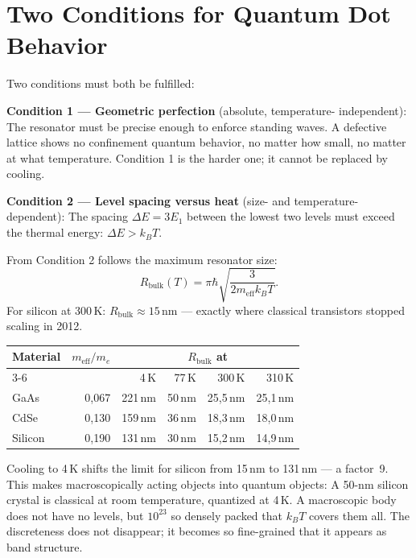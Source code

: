 \section{Two Conditions for Quantum Dot Behavior}

Two conditions must both be fulfilled:

\textbf{Condition 1 --- Geometric perfection} (absolute, temperature-
independent): The resonator must be precise enough to enforce standing waves. A defective lattice shows no confinement
quantum behavior, no matter how small, no matter at what temperature. Condition 1
is the harder one; it cannot be replaced by cooling.

\textbf{Condition 2 --- Level spacing versus heat} (size- and
temperature-dependent): The spacing $\Delta E = 3E_1$ between the lowest
two levels must exceed the thermal energy: $\Delta E > k_BT$.

From Condition 2 follows the maximum resonator size:
\begin{equation}
  R_{\mathrm{bulk}}(T) = \pi\hbar\sqrt{\frac{3}{2m_{\mathrm{eff}}k_BT}}.
\end{equation}
For silicon at 300\,K: $R_{\mathrm{bulk}}\approx15$\,nm --- exactly where
classical transistors stopped scaling in 2012.

\begin{center}
\small
\begin{tabular}{lrrrrr}
\toprule
\textbf{Material} & $m_{\mathrm{eff}}/m_e$ & \multicolumn{4}{c}{$R_{\mathrm{bulk}}$ at} \\
\cmidrule(lr){3-6}
 & & 4\,K & 77\,K & 300\,K & 310\,K \\
\midrule
GaAs & 0{,}067 & 221\,nm & 50\,nm & 25{,}5\,nm & 25{,}1\,nm \\
CdSe & 0{,}130 & 159\,nm & 36\,nm & 18{,}3\,nm & 18{,}0\,nm \\
Silicon & 0{,}190 & 131\,nm & 30\,nm & 15{,}2\,nm & 14{,}9\,nm \\
\bottomrule
\end{tabular}
\end{center}

Cooling to 4\,K shifts the limit for silicon from 15\,nm to
131\,nm --- a factor~9. This makes macroscopically acting objects into
quantum objects: A 50-nm silicon crystal is classical at room temperature,
quantized at 4\,K. A macroscopic body does not have
no levels, but $10^{23}$ so densely packed that $k_BT$ covers them all.
The discreteness does not disappear; it becomes so fine-grained
that it appears as band structure.

